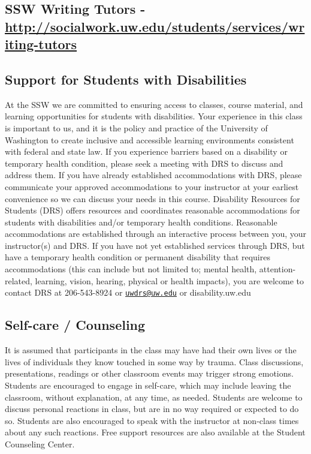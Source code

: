 \documentclass[11pt,]{article}
\begin{document}
\subsection{\texorpdfstring{SSW Writing Tutors -
\url{http://socialwork.uw.edu/students/services/writing-tutors}}{SSW Writing Tutors - http://socialwork.uw.edu/students/services/writing-tutors}}\label{ssw-writing-tutors---httpsocialwork.uw.edustudentsserviceswriting-tutors}

\subsection{Support for Students with
Disabilities}\label{support-for-students-with-disabilities}

At the SSW we are committed to ensuring access to classes, course
material, and learning opportunities for students with disabilities.
Your experience in this class is important to us, and it is the policy
and practice of the University of Washington to create inclusive and
accessible learning environments consistent with federal and state law.
If you experience barriers based on a disability or temporary health
condition, please seek a meeting with DRS to discuss and address them.
If you have already established accommodations with DRS, please
communicate your approved accommodations to your instructor at your
earliest convenience so we can discuss your needs in this course.
Disability Resources for Students (DRS) offers resources and coordinates
reasonable accommodations for students with disabilities and/or
temporary health conditions. Reasonable accommodations are established
through an interactive process between you, your instructor(s) and DRS.
If you have not yet established services through DRS, but have a
temporary health condition or permanent disability that requires
accommodations (this can include but not limited to; mental health,
attention-related, learning, vision, hearing, physical or health
impacts), you are welcome to contact DRS at 206-543-8924 or
\href{mailto:uwdrs@uw.edu}{\nolinkurl{uwdrs@uw.edu}} or
disability.uw.edu

\subsection{Self-care / Counseling}\label{self-care-counseling}

It is assumed that participants in the class may have had their own
lives or the lives of individuals they know touched in some way by
trauma. Class discussions, presentations, readings or other classroom
events may trigger strong emotions. Students are encouraged to engage in
self-care, which may include leaving the classroom, without explanation,
at any time, as needed. Students are welcome to discuss personal
reactions in class, but are in no way required or expected to do so.
Students are also encouraged to speak with the instructor at non-class
times about any such reactions. Free support resources are also
available at the Student Counseling Center.
\end{document}
